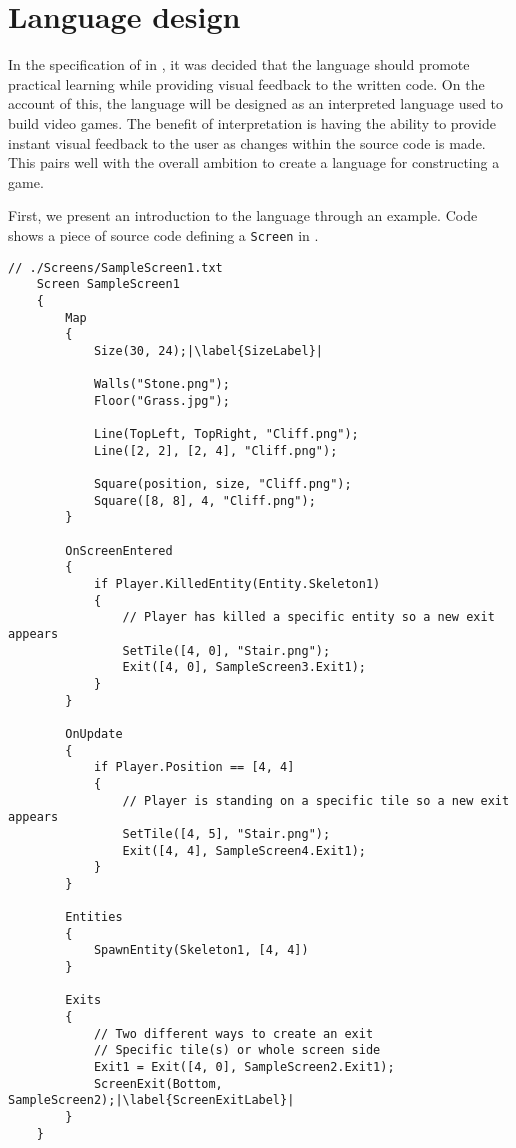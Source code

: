 \chapter{Language design}\label{chap:language_design}
In the specification of \dazel{} in , it was decided that the language should promote practical learning while providing visual feedback to the written code. On the account of this, the \dazel{} language will be designed as an interpreted language used to build video games. The benefit of interpretation is having the ability to provide instant visual feedback to the user as changes within the source code is made. This pairs well with the overall ambition to create a language for constructing a game.

First, we present an introduction to the \dazel{} language through an example. Code  shows a piece of source code defining a \texttt{Screen} in \dazel{}.

\begin{lstlisting}[caption={Example screen.}, label={lst:SampleScreen1},escapechar=|]
    // ./Screens/SampleScreen1.txt
    Screen SampleScreen1 
    {
        Map 
        {
            Size(30, 24);|\label{SizeLabel}|
    
            Walls("Stone.png"); 
            Floor("Grass.jpg");
    
            Line(TopLeft, TopRight, "Cliff.png");
            Line([2, 2], [2, 4], "Cliff.png");
    
            Square(position, size, "Cliff.png");
            Square([8, 8], 4, "Cliff.png");
        }
    
        OnScreenEntered
        {
            if Player.KilledEntity(Entity.Skeleton1) 
            {
                // Player has killed a specific entity so a new exit appears
                SetTile([4, 0], "Stair.png");
                Exit([4, 0], SampleScreen3.Exit1);
            }
        }
    
        OnUpdate
        {
            if Player.Position == [4, 4] 
            {
                // Player is standing on a specific tile so a new exit appears
                SetTile([4, 5], "Stair.png");
                Exit([4, 4], SampleScreen4.Exit1);
            }
        }
    
        Entities
        {
            SpawnEntity(Skeleton1, [4, 4])
        }
        
        Exits 
        {
            // Two different ways to create an exit
            // Specific tile(s) or whole screen side
            Exit1 = Exit([4, 0], SampleScreen2.Exit1);
            ScreenExit(Bottom, SampleScreen2);|\label{ScreenExitLabel}|
        }
    }
    \end{lstlisting}

